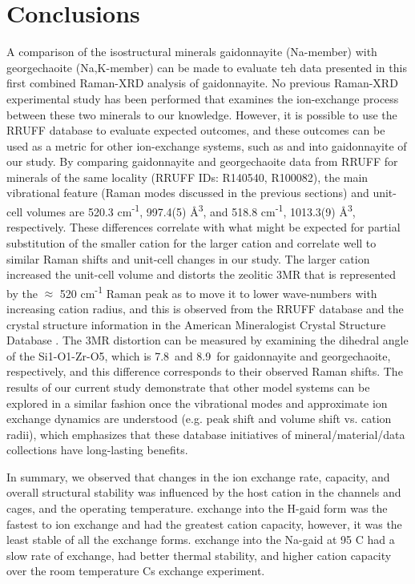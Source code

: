 \documentclass[journal=acsodf,manuscript=article]{achemso}
\begin{document}
\section{Conclusions}
A comparison of the isostructural minerals gaidonnayite
(Na-member) \cite{Chao1985} with georgechaoite (Na,K-member) \cite{Ghose1985} can be made to evaluate teh data presented in this first combined Raman-XRD analysis of gaidonnayite. No previous Raman-XRD experimental study has
been performed that examines the ion-exchange process between these two
minerals to our knowledge.  However, it is possible to use the
RRUFF \cite{Lafuente} database to evaluate expected outcomes, and
these outcomes can be used as a metric for other ion-exchange systems,
such as  and  into gaidonnayite
of our study.  By comparing gaidonnayite and georgechaoite data from
RRUFF for minerals of the same locality (RRUFF IDs: R140540, R100082),
the main vibrational feature (Raman modes discussed in the previous
sections) and unit-cell volumes are 520.3 cm\textsuperscript{-1},
997.4(5) \AA\textsuperscript{3}, and 518.8 cm\textsuperscript{-1},
1013.3(9) \AA\textsuperscript{3}, respectively.    These differences correlate with what might be expected for
partial substitution of the smaller  cation for the
larger  cation and correlate well to similar 
Raman shifts and unit-cell changes in our study.  The larger
 cation increased the unit-cell volume and distorts
the zeolitic 3MR that is represented by the \(\approx\) 520
cm\textsuperscript{-1} Raman peak as to move it to lower wave-numbers
with increasing cation radius, and this is observed from the RRUFF
database and the crystal structure information in the American
Mineralogist Crystal Structure Database \cite{Downs2003}. The 3MR
distortion can be measured by examining the dihedral angle of the
Si1-O1-Zr-O5, which is 7.8\degree\ and 8.9\degree\
for gaidonnayite and georgechaoite, respectively, and this
difference corresponds to their observed Raman
shifts.  The results of our current
study
demonstrate that other model systems can be explored in a similar
fashion once the vibrational modes and approximate ion exchange dynamics
are understood (e.g. peak shift and volume shift vs. cation radii), which emphasizes that these database
initiatives of mineral/material/data collections have long-lasting
benefits.

In summary, we observed that changes in the ion exchange rate, capacity,
and overall structural stability was influenced by the host cation in
the channels and cages, and the operating temperature. 
 exchange into the H-gaid form was the fastest to
ion exchange and had the greatest cation capacity, however, it was the
least stable of all the exchange forms.  \ce{Cs+} exchange
into the Na-gaid at 95 \degree C had a slow rate of exchange, had
better thermal stability, and higher cation capacity over the room
temperature Cs exchange experiment.  
\end{document}
